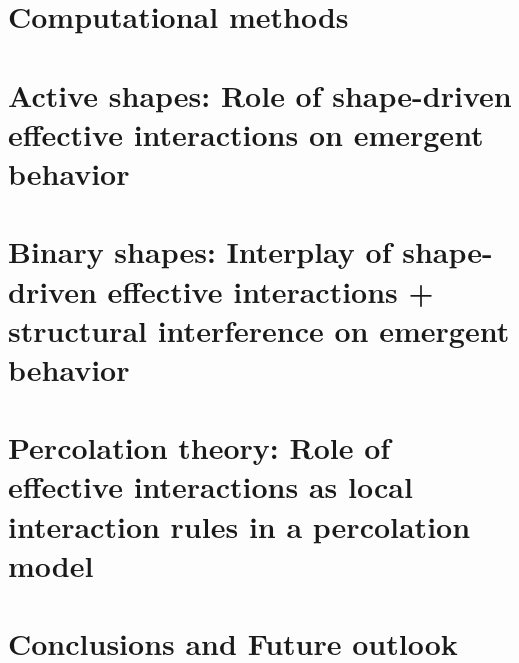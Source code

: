 \documentclass[leqno]{report}
\theoremstyle{plain}
\theoremstyle{definition}
\theoremstyle{remark}
\numberwithin{theorem}{chapter}        %
\begin{document}
\chapter{Computational methods}
\label{ch:methods}


\chapter{Active shapes: Role of shape-driven effective interactions on emergent behavior}
\label{ch:active-shapes}


\chapter{Binary shapes: Interplay of shape-driven effective interactions + structural interference on emergent behavior}
\label{ch:binary-shapes}

\chapter{Percolation theory: Role of effective interactions as local interaction rules in a percolation model}
\label{ch:percolation}

\chapter{Conclusions and Future outlook}
\label{ch:conclusions}


%


\end{document}
